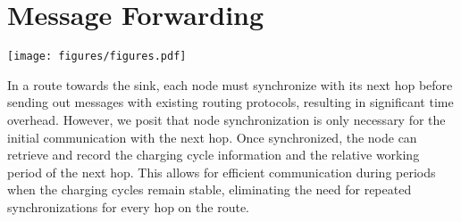 \documentclass[lettersize,journal]{IEEEtran}
\newcommand{\ours}{Swift\xspace}
\begin{document}
\section{Message Forwarding}
\label{sec:forward}
\begin{figure*}[!th]
    \centering
    \texttt{[image: figures/figures.pdf]}
    \caption{Illustration of the state changes with the \ours-forward mechanism, where we show how the charging cycles of the sender should be adapted to synchronize with its next hop (e.g., the receiver) directly and reverse back when the message forwarding is completed. The receiver is passive and the sender uses the receiver's charging cycle as its reference.}
    \label{fig:forward:states}
\end{figure*}

In a route towards the sink, each node must synchronize with its next hop before sending out messages with existing routing protocols, resulting in significant time overhead. However, we posit that node synchronization is only necessary for the initial communication with the next hop. Once synchronized, the node can retrieve and record the charging cycle information and the relative working period of the next hop. This allows for efficient communication during periods when the charging cycles remain stable, eliminating the need for repeated synchronizations for every hop on the route.
\end{document}
